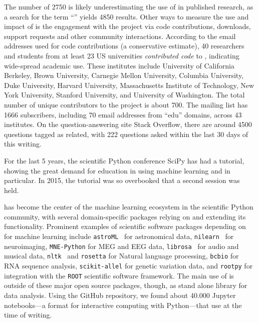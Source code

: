 The number of 2750 is likely underestimating the use of \sklearn{} in published
research, as a search for the term ``\sklearn{}'' yields 4850 results.
Other ways to measure the use and impact of \sklearn{} is the engagement with
the project via code contributions, downloads, support requests and other
community interactions.
According to the email addresses used for code contributions (a conservative
estimate), 40 researchers and students from at least 23 US universities
\emph{contributed code} to \sklearn{}, indicating wide-spread academic use.
These institutes include University of California Berkeley, Brown University,
Carnegie Mellon University, Columbia University, Duke University, Harvard
University, Massachusetts Institute of Technology, New York University,
Stanford University, and University of Washington.
The total number of unique contributors to the project is about 700.
%
The \sklearn{} mailing list has 1666 subscribers, including 70 email
addresses from ``edu'' domains, across 43 institutes.
%
On the question-answering site Stack Overflow, there are around 4500 questions
tagged as \sklearn{} related, with 222 questions asked within the last 30
days of this writing.

For the last 5 years, the scientific Python conference SciPy has had a \sklearn{} tutorial,
showing the great demand for education in using machine learning and \sklearn{} in particular.
In 2015, the tutorial was so overbooked that a second session was held.

\sklearn{} has become the center of the machine learning ecosystem in the scientific Python community,
with several domain-specific packages relying on and extending its functionality.
Prominent examples of scientific software packages depending on \sklearn{}
for machine learning include \texttt{astroML}~\autocite{van2013openml} for astronomical
data, \texttt{nilearn}~\autocite{abraham2014machine} for neuroimaging, \texttt{MNE-Python} for MEG
and EEG data, \texttt{librosa}~\autocite{mcfee2015librosa} for audio and musical data,
\texttt{nltk}~\autocite{bird2006nltk} and \texttt{rosetta} for Natural language processing, \texttt{bcbio} for
RNA sequence analysis, \texttt{scikit-allel} for genetic variation data, and \texttt{rootpy} for
integration with the \texttt{ROOT} scientific software framework.
The main use of \sklearn{} is outside of these major open source packages, though,
as stand alone library for data analysis. Using the GitHub repository, we found
about 40.000 Jupyter notebooks---a format for interactive computing with
Python---that use \sklearn{} at the time of writing.

